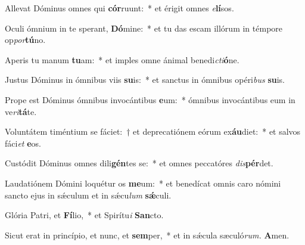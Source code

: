 \item Allevat Dóminus omnes qui \textbf{cór}ruunt:~* et érigit omnes \textit{e}\textbf{lí}sos.
\item Oculi ómnium in te sperant, \textbf{Dó}mine:~* et tu das escam illórum in témpore op\hspace{0.01em}\textit{por}\textbf{tú}no.
\item Aperis tu manum \textbf{tu}am:~* et imples omne ánimal benedi\hspace{0.03em}\textit{cti}\textbf{ó}ne.
\item Justus Dóminus in ómnibus viis \textbf{su}is:~* et sanctus in ómnibus opéri\textit{bus} \textbf{su}is.
\item Prope est Dóminus ómnibus invocántibus \textbf{e}um:~* ómnibus invocántibus eum in ve\hspace{0.03em}\textit{ri}\textbf{tá}te.
\item Voluntátem timéntium se fáciet:~† et deprecatiónem eórum ex\textbf{áu}diet:~* et salvos fáci\tinyhspace\textit{et} \textbf{e}os.
\item Custódit Dóminus omnes dili\textbf{gén}tes se:~* et omnes peccatóres \textit{dis}\textbf{pér}det.
\item Laudatiónem Dómini loquétur os \textbf{me}um:~* et benedícat omnis caro nómini sancto ejus in sǽculum et in sǽcu\hspace{0.03em}\textit{lum} \textbf{sǽ}culi.
\item Glória Patri, et \textbf{Fí}lio,~* et Spirítu\hspace{0.03em}\textit{i} \textbf{San}cto.
\item Sicut erat in princípio, et nunc, et \textbf{sem}per,~* et in sǽcula sæculó\textit{rum.} \textbf{A}men.
